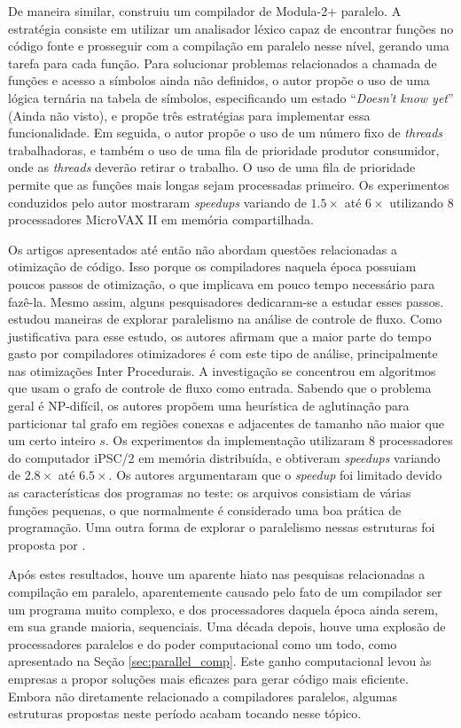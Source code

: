 De maneira similar, \cite{wortman1992} construiu um compilador de Modula-2+
paralelo. A estratégia consiste em utilizar um analisador léxico capaz de
encontrar funções no código fonte e prosseguir com a compilação em paralelo
nesse nível, gerando uma tarefa para cada função. Para solucionar problemas
relacionados a chamada de funções e
acesso a símbolos ainda não definidos, o autor propõe o uso de
uma lógica ternária na tabela de símbolos, especificando um estado
``\textit{Doesn't know yet}'' (Ainda não visto), e propõe três estratégias para
implementar essa funcionalidade. Em seguida, o autor propõe o uso de
um número fixo de \textit{threads} trabalhadoras, e também o uso de uma fila de
prioridade produtor consumidor, onde as \textit{threads} deverão retirar o trabalho.
O uso de uma fila de prioridade permite que as funções mais longas sejam
processadas primeiro. Os experimentos conduzidos pelo autor mostraram
\textit{speedups} variando de $1.5\times$ até $6\times$ utilizando 8
processadores MicroVAX II em memória compartilhada.

Os artigos apresentados até então não abordam questões relacionadas
a otimização de código. Isso porque os compiladores naquela época possuiam poucos
passos de otimização, o que implicava em pouco tempo necessário para fazê-la.
Mesmo assim, alguns pesquisadores dedicaram-se a estudar esses passos.
\cite{Lee1994} estudou maneiras de explorar paralelismo na análise de controle
de fluxo. Como justificativa para esse estudo, os autores afirmam que a maior parte
do tempo gasto por compiladores otimizadores é com este tipo de análise,
principalmente nas otimizações Inter Procedurais. 
A investigação se concentrou em algoritmos que usam o grafo de controle
de fluxo como entrada. Sabendo que o
problema geral é NP-difícil, os autores propõem uma heurística de aglutinação
para particionar tal grafo em regiões conexas e adjacentes de tamanho não maior
que um certo inteiro $s$. Os experimentos da implementação utilizaram
8 processadores do computador iPSC/2 em memória distribuída, e 
obtiveram \textit{speedups} variando de
$2.8 \times$ até $6.5\times$. Os autores argumentaram que o \textit{speedup} foi
limitado devido as características dos programas no teste: os arquivos consistiam
de várias funções pequenas, o que normalmente é considerado uma boa prática de
programação. Uma outra forma de explorar o paralelismo nessas estruturas
foi proposta por \cite{kramer1994combining}.

Após estes resultados, houve um aparente hiato nas pesquisas relacionadas a
compilação em paralelo, aparentemente causado pelo fato de um compilador ser
um programa muito complexo, e dos processadores daquela época ainda serem, em sua grande
maioria, sequenciais. Uma década depois, houve uma explosão de processadores
paralelos e do poder computacional como um todo, como apresentado na Seção
\ref{sec:parallel_comp}. Este ganho computacional levou às empresas a propor soluções mais eficazes para
gerar código mais eficiente. Embora não diretamente relacionado a compiladores paralelos,
algumas estruturas propostas neste período acabam tocando nesse tópico.

